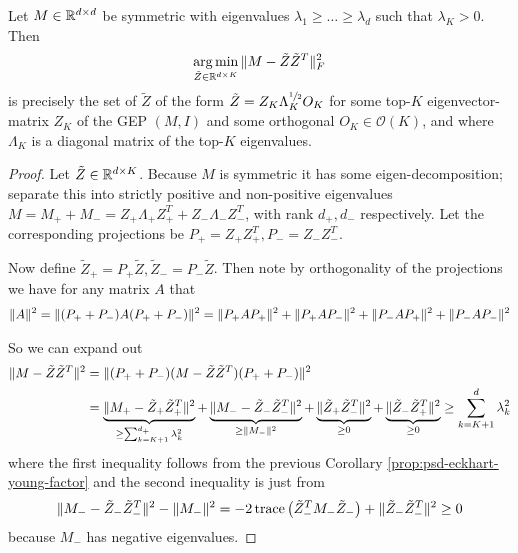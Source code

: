 \begin{corollary}\label{cor:sym-eckhart-young-factor}
Let $M \in \mathbb{R}^{d\times d}$ be symmetric with eigenvalues $\lambda_1\geq \dots \geq \lambda_d$ such that $\lambda_K > 0$.
Then
\begin{align*}
    \operatorname*{arg\,min}_{\tilde{Z} \in \mathbb{R}^{d \times K}} \| M - \tilde{Z} \tilde{Z}^T \|_F^2
\end{align*}
is precisely the set of $\tilde{Z}$ of the form $\tilde{Z} = Z_K \Lambda_K^{\sfrac{1}{2}} O_K$ for some top-$K$ eigenvector-matrix $Z_K$ of the GEP $(M,I)$ and some orthogonal $O_K \in \mathcal{O}(K)$, and where $\Lambda_K$ is a diagonal matrix of the top-$K$ eigenvalues.
\end{corollary}
\begin{proof}
    Let $\tilde{Z} \in \mathbb{R}^{d\times K}$.
    Because $M$ is symmetric it has some eigen-decomposition; separate this into strictly positive and non-positive eigenvalues $M = M_+ + M_- = Z_+ \Lambda_+ Z_+^T + Z_- \Lambda_- Z_-^T$, with rank $d_+,d_-$ respectively.
    Let the corresponding projections be $P_+ = Z_+ Z_+^T, P_- = Z_- Z_-^T$.

    Now define $\tilde{Z}_+ = P_+ \tilde{Z}, \tilde{Z}_- = P_- \tilde{Z}$. Then note by orthogonality of the projections we have for any matrix $A$ that
    \begin{align*}
        \lVert A\rVert^2 = \lVert(P_+ + P_-) A (P_+ + P_-)\rVert^2 = \lVert P_+ A P_+\rVert^2 + \lVert P_+ A P_-\rVert^2 + \lVert P_- A P_+\rVert^2 + \lVert P_- A P_-\rVert^2
    \end{align*}

    So we can expand out
    \begin{align}
        \lVert M - \tilde{Z}\tilde{Z}^T\rVert^2
        &= \lVert(P_+ + P_-) (M - \tilde{Z}\tilde{Z}^T) (P_+ + P_-)\rVert^2 \nonumber \\
        &= \underbrace{\lVert M_+ - \tilde{Z}_+ \tilde{Z}_+^T\rVert^2}_{\geq \sum_{k=K+1}^{d_+} \lambda_k^2} + \underbrace{\lVert M_- - \tilde{Z}_- \tilde{Z}_-^T\rVert^2}_{\geq \lVert M_-\rVert^2}
        + \underbrace{\lVert\tilde{Z}_+ \tilde{Z}_-^T\rVert^2}_{\geq 0} + \underbrace{\lVert\tilde{Z}_- \tilde{Z}_+^T\rVert^2}_{\geq 0}
        \geq \sum_{k=K+1}^d \lambda_k^2
        \label{eq:chasing-equality}
    \end{align}
    where the first inequality follows from the previous Corollary \ref{prop:psd-eckhart-young-factor} and the second inequality is just from
    \begin{align*}
        \lVert M_- - \tilde{Z}_- \tilde{Z}_-^T\rVert^2 - \lVert M_-\rVert^2 = - 2 \operatorname{trace}\left( \tilde{Z}_-^T M_- \tilde{Z}_- \right)  + \lVert\tilde{Z}_- \tilde{Z}_-^T\rVert^2 \geq 0
    \end{align*}
    because $M_-$ has negative eigenvalues.


\end{proof}
